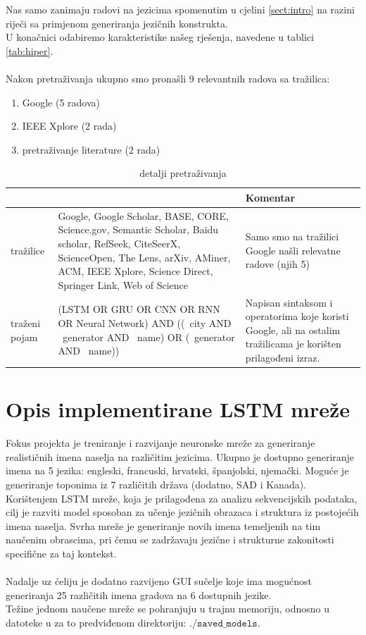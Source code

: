 \documentclass[conference]{IEEEtran}
\begin{document}
Nas samo zanimaju radovi na jezicima spomenutim u cjelini \ref{sect:intro} na razini riječi sa primjenom generiranja jezičnih konstrukta.\\
U konačnici odabiremo karakteristike našeg rješenja, navedene u tablici \ref{tab:hiper}.\\
\\
Nakon pretraživanja ukupno smo pronašli 9 relevantnih radova sa tražilica:
\begin{enumerate}
\item Google (5 radova)
\item IEEE Xplore (2 rada)
\item pretraživanje literature (2 rada)
\end{enumerate}
\begin{table}[htbp]
\caption{detalji pretraživanja}
\begin{center}
\begin{tabular}{|p{50pt}|p{110pt}|p{70pt}|}
\hline
 & & \textbf{Komentar}\\ \hline
tražilice & Google, Google Scholar, BASE, CORE, Science.gov, Semantic Scholar, Baidu scholar, RefSeek, CiteSeerX, ScienceOpen, The Lens, arXiv, AMiner, ACM, IEEE Xplore, Science Direct,  Springer Link, Web of Science & Samo smo na tražilici Google našli relevatne radove (njih 5)  \\ \hline
traženi pojam & (LSTM OR GRU OR CNN OR RNN OR Neural Network) AND ((~city AND ~generator AND ~name) OR (~generator AND ~name)) & Napisan sintaksom i operatorima koje koristi Google, ali na ostalim tražilicama je korišten prilagođeni izraz.\\ \hline
\end{tabular}
\label{tab:trening}
\end{center}
\end{table}





\section{Opis implementirane LSTM mreže}
Fokus projekta je treniranje i razvijanje neuronske mreže za generiranje realističnih imena naselja na različitim jezicima. Ukupno je dostupno generiranje imena na 5 jezika: engleski, francuski, hrvatski, španjolski, njemački. Moguće je generiranje toponima iz 7 različitih država (dodatno, SAD i Kanada). Korištenjem LSTM mreže, koja je prilagođena za analizu sekvencijskih podataka, cilj je razviti model sposoban za učenje jezičnih obrazaca i struktura iz postojećih imena naselja. Svrha mreže je generiranje novih imena temeljenih na tim naučenim obrascima, pri čemu se zadržavaju jezične i strukturne zakonitosti specifične za taj kontekst.\\
\\
Nadalje uz ćeliju je dodatno razvijeno GUI sučelje koje ima mogućnost generiranja 25 različitih imena gradova na 6 dostupnih jezike.\\
Težine jednom naučene mreže se pohranjuju u trajnu memoriju, odnosno u datoteke u za to predviđenom direktoriju: $\mathtt{./saved\_models}$.
\end{document}
